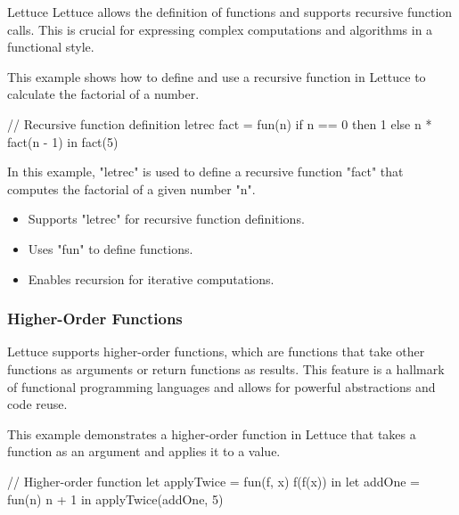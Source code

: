 \begin{notes}{Lettuce}
    Lettuce allows the definition of functions and supports recursive function calls. This is crucial for expressing complex computations and algorithms in a functional style.
    
    \begin{highlight}
    
        This example shows how to define and use a recursive function in Lettuce to calculate the factorial of a number.
    
    \begin{code}[Lettuce]
    // Recursive function definition
    letrec fact = fun(n) {
        if n == 0 then 1 else n * fact(n - 1)
    } in
    fact(5)
    \end{code}
    
        In this example, "letrec" is used to define a recursive function "fact" that computes the factorial of a given number "n".
    
        \begin{itemize}
            \item Supports "letrec" for recursive function definitions.
            \item Uses "fun" to define functions.
            \item Enables recursion for iterative computations.
        \end{itemize}
    
    \end{highlight}
    
    \subsubsection*{Higher-Order Functions}
    
    Lettuce supports higher-order functions, which are functions that take other functions as arguments or return functions as results. This feature is a hallmark of functional programming languages and allows for powerful abstractions and code reuse.
    
    \begin{highlight}
    
        This example demonstrates a higher-order function in Lettuce that takes a function as an argument and applies it to a value.
    
    \begin{code}[Lettuce]
    // Higher-order function
    let applyTwice = fun(f, x) {
        f(f(x))
    } in
    let addOne = fun(n) {
        n + 1
    } in
    applyTwice(addOne, 5)
    \end{code}
    

\end{highlight}
\end{notes}

